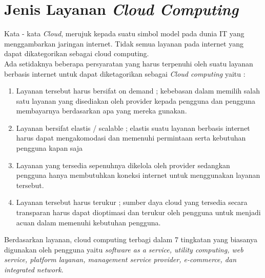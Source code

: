 \date{}
\section{Jenis Layanan \textit{Cloud Computing}}
\tab Kata - kata \textit{Cloud}, merujuk kepada suatu simbol model pada dunia IT yang menggambarkan jaringan internet. Tidak semua layanan pada internet yang dapat dikategorikan sebagai cloud computing.\\
\tab Ada setidaknya beberapa persyaratan yang harus terpenuhi oleh suatu layanan berbasis internet untuk dapat diketagorikan sebagai \textit{Cloud computing} yaitu :\\
\begin{enumerate}
\item Layanan tersebut harus bersifat on demand ; kebebasan dalam memilih salah satu layanan yang disediakan oleh provider kepada pengguna dan pengguna membayarnya berdasarkan apa yang mereka gunakan.
\item Layanan bersifat elastis / scalable ; elastis suatu layanan berbasis internet harus dapat mengakomodasi dan memenuhi permintaan serta kebutuhan pengguna kapan saja
\item Layanan yang tersedia sepenuhnya dikelola oleh provider sedangkan pengguna hanya membutuhkan koneksi internet untuk menggunakan layanan tersebut.
\item Layanan tersebut harus terukur ; sumber daya cloud yang tersedia secara transparan harus dapat dioptimasi dan terukur oleh pengguna untuk menjadi acuan dalam memenuhi kebutuhan pengguna.
\end{enumerate}
\tab Berdasarkan layanan, cloud computing terbagi dalam 7 tingkatan yang biasanya digunakan oleh pengguna yaitu \textit{software as a service, utility computing, web service, platform layanan, management service provider, e-commerce, dan integrated network}.\\

